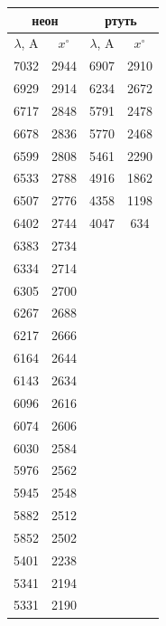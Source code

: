 \documentclass[a4paper,12pt]{article} %
\begin{document}
\begin{floatingtable}
\begin{tabular}{|c|c|cc}
\hline
\multicolumn{2}{|c|}{неон} & \multicolumn{2}{c|}{ртуть} \\ \hline
$\lambda$, A & $x^{\circ}$ & \multicolumn{1}{c|}{$\lambda$, A} & \multicolumn{1}{c|}{$x^{\circ}$} \\ \hline
7032 & 2944 & \multicolumn{1}{c|}{6907} & \multicolumn{1}{c|}{2910} \\ \hline
6929 & 2914 & \multicolumn{1}{c|}{6234} & \multicolumn{1}{c|}{2672} \\ \hline
6717 & 2848 & \multicolumn{1}{c|}{5791} & \multicolumn{1}{c|}{2478} \\ \hline
6678 & 2836 & \multicolumn{1}{c|}{5770} & \multicolumn{1}{c|}{2468} \\ \hline
6599 & 2808 & \multicolumn{1}{c|}{5461} & \multicolumn{1}{c|}{2290} \\ \hline
6533 & 2788 & \multicolumn{1}{c|}{4916} & \multicolumn{1}{c|}{1862} \\ \hline
6507 & 2776 & \multicolumn{1}{c|}{4358} & \multicolumn{1}{c|}{1198} \\ \hline
6402 & 2744 & \multicolumn{1}{c|}{4047} & \multicolumn{1}{c|}{634} \\ \hline
6383 & 2734 & \multicolumn{2}{c}{\multirow{17}{*}{}} \\ \cline{1-2}
6334 & 2714 & \multicolumn{2}{c}{} \\ \cline{1-2}
6305 & 2700 & \multicolumn{2}{c}{} \\ \cline{1-2}
6267 & 2688 & \multicolumn{2}{c}{} \\ \cline{1-2}
6217 & 2666 & \multicolumn{2}{c}{} \\ \cline{1-2}
6164 & 2644 & \multicolumn{2}{c}{} \\ \cline{1-2}
6143 & 2634 & \multicolumn{2}{c}{} \\ \cline{1-2}
6096 & 2616 & \multicolumn{2}{c}{} \\ \cline{1-2}
6074 & 2606 & \multicolumn{2}{c}{} \\ \cline{1-2}
6030 & 2584 & \multicolumn{2}{c}{} \\ \cline{1-2}
5976 & 2562 & \multicolumn{2}{c}{} \\ \cline{1-2}
5945 & 2548 & \multicolumn{2}{c}{} \\ \cline{1-2}
5882 & 2512 & \multicolumn{2}{c}{} \\ \cline{1-2}
5852 & 2502 & \multicolumn{2}{c}{} \\ \cline{1-2}
5401 & 2238 & \multicolumn{2}{c}{} \\ \cline{1-2}
5341 & 2194 & \multicolumn{2}{c}{} \\ \cline{1-2}
5331 & 2190 & \multicolumn{2}{c}{} \\ \cline{1-2}
\end{tabular}
\end{floatingtable}
\end{document}
